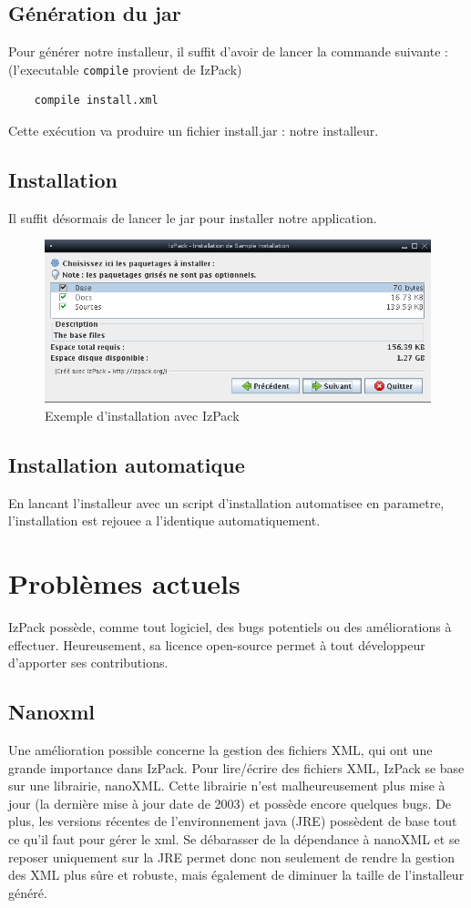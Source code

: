 \subsection{Génération du jar}
Pour générer notre installeur, il suffit d'avoir de lancer la commande suivante : (l'executable \verb|compile| provient de IzPack)
\begin{verbatim}
	compile install.xml
\end{verbatim}
Cette exécution va produire un fichier install.jar : notre installeur.
\subsection{Installation}
Il suffit désormais de lancer le jar pour installer notre application.
\begin{figure}[H]
	\centering
	\includegraphics[width=15cm]{../image/installSample.png}
	\caption{Exemple d'installation avec IzPack}
\end{figure}

\subsection{Installation automatique}
En lancant l'installeur avec un script d'installation automatisee en parametre, l'installation est rejouee a l'identique automatiquement.

\section{Problèmes actuels}
IzPack possède, comme tout logiciel, des bugs potentiels ou des améliorations à effectuer.
Heureusement, sa licence open-source permet à tout développeur d'apporter ses contributions.

\subsection{Nanoxml}
Une amélioration possible concerne la gestion des fichiers XML, qui ont une grande importance dans IzPack.
Pour lire/écrire des fichiers XML, IzPack se base sur une librairie, nanoXML. Cette librairie n'est malheureusement plus mise à jour (la dernière mise à jour date de 2003) et possède encore quelques bugs.
De plus, les versions récentes de l'environnement java (JRE) possèdent de base tout ce qu'il faut pour gérer le xml.
Se débarasser de la dépendance à nanoXML et se reposer uniquement sur la JRE permet donc non seulement de rendre la gestion des XML plus sûre et robuste, mais également de diminuer la taille de l'installeur généré.